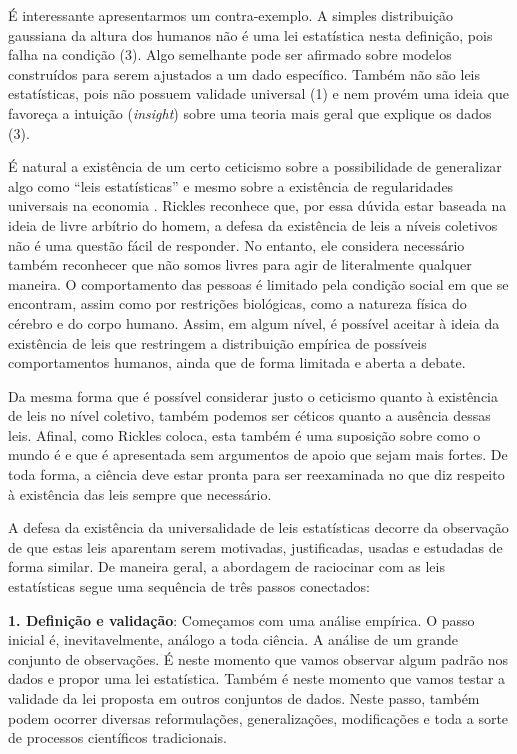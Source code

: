 É interessante apresentarmos um contra-exemplo. A simples distribuição gaussiana da altura dos humanos não é uma lei estatística nesta definição, pois falha na condição (3). Algo semelhante pode ser afirmado sobre modelos construídos para serem ajustados a um dado específico. Também não são leis estatísticas, pois não possuem validade universal (1) e nem provém uma ideia que favoreça a intuição (\textit{insight})  sobre uma teoria mais geral que explique os dados (3).

É natural a existência de um certo ceticismo sobre a possibilidade de generalizar algo como ``leis estatísticas'' e mesmo sobre a existência de regularidades universais na economia \cite{GALLEGATI20061}.  Rickles reconhece que, por essa dúvida estar baseada na ideia de livre arbítrio do homem,  a defesa da existência de leis a níveis coletivos não é uma questão fácil de responder. No entanto, ele considera necessário também reconhecer que não somos livres para agir de literalmente qualquer maneira. O comportamento das pessoas é limitado pela condição social em que se encontram, assim como por restrições biológicas, como a natureza física do cérebro e do corpo humano. Assim, em algum nível, é possível aceitar à ideia da existência de leis que restringem a distribuição empírica de possíveis comportamentos humanos, ainda que de forma limitada e aberta a debate\cite{RICKLES2007948}.

Da mesma forma que é possível considerar justo o ceticismo quanto à existência de leis no nível coletivo, também podemos ser céticos quanto a ausência dessas leis. Afinal, como Rickles coloca, esta também é uma suposição sobre como o mundo é e que é apresentada sem argumentos de apoio que sejam mais fortes. De toda forma,  a ciência deve estar pronta para ser reexaminada no que diz respeito à existência das leis sempre que necessário.

A defesa da  existência da universalidade de leis estatísticas decorre da observação de que estas leis aparentam serem motivadas, justificadas, usadas e estudadas de forma similar. De maneira geral, a abordagem de raciocinar com as leis estatísticas segue uma sequência de três passos conectados\cite{Altmann_2024}:

\textbf{1. Definição e validação}: Começamos com uma análise empírica. O passo inicial é, inevitavelmente, análogo a toda ciência. A análise de um grande conjunto de observações. É neste momento que vamos observar algum padrão nos dados e propor uma lei estatística. Também é neste momento que vamos testar a validade da lei proposta em outros conjuntos de dados. Neste passo, também podem ocorrer diversas reformulações, generalizações, modificações e toda a sorte de processos científicos tradicionais. 

